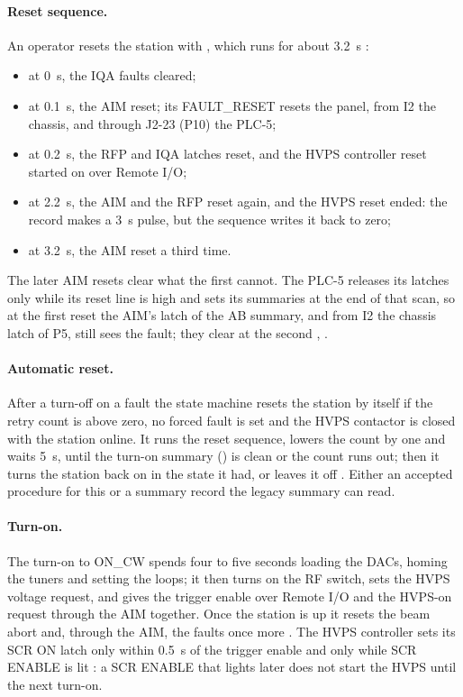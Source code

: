 \paragraph{Reset sequence.} An operator resets the station with
, which runs for about \qty{3.2}{\second} :
\begin{itemize}
\item at \qty{0}{\second}, the IQA faults cleared;
\item at \qty{0.1}{\second}, the AIM reset; its FAULT\_RESET resets the panel, from I2
the chassis, and through J2-23 (P10) the PLC-5;
\item at \qty{0.2}{\second}, the RFP and IQA latches reset, and the HVPS controller
reset started on  over Remote I/O;
\item at \qty{2.2}{\second}, the AIM and the RFP reset again, and the HVPS reset ended:
the record makes a \qty{3}{\second} pulse, but the sequence writes it back to zero;
\item at \qty{3.2}{\second}, the AIM reset a third time.
\end{itemize}
The later AIM resets clear what the first cannot. The PLC-5 releases its latches only
while its reset line is high and sets its summaries at the end of that scan, so at the
first reset the AIM's latch of the AB summary, and from I2 the chassis latch of P5,
still sees the fault; they clear at the second , .

\paragraph{Automatic reset.} After a turn-off on a fault the state machine resets the
station by itself if the retry count  is above zero, no
forced fault is set and the HVPS contactor is closed with the station online. It runs
the reset sequence, lowers the count by one and waits \qty{5}{\second}, until the
turn-on summary () is clean or the count runs out; then it
turns the station back on in the state it had, or leaves it off . Either an accepted procedure for this or a summary record the legacy summary can read.

\paragraph{Turn-on.} The turn-on to ON\_CW spends four to five seconds loading the
DACs, homing the tuners and setting the loops; it then turns on the RF switch, sets
the HVPS voltage request, and gives the trigger enable over Remote I/O and the HVPS-on
request through the AIM together. Once the station is up it resets the beam abort
and, through the AIM, the faults once more . The HVPS controller sets its
SCR ON latch only within \qty{0.5}{\second} of the trigger enable and only while SCR
ENABLE is lit : a SCR ENABLE that lights later does not start the HVPS until the
next turn-on.

